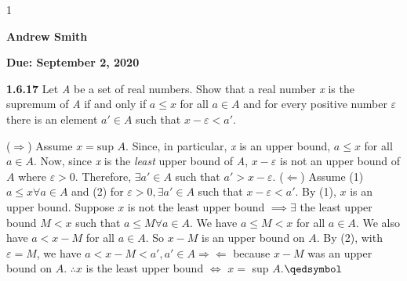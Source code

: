 \documentclass[12pt]{article}
\newcommand{\duedate}{September 2, 2020}
\newcommand{\yourname}{Andrew Smith}
\def\printsolutions{1}
\begin{document}
\if\printsolutions1
\begin{center}
\textbf{\Large \yourname}
\end{center}
\else
\begin{center}
\textbf{\Large Due: \duedate}
\end{center}
\fi


\begin{problem}\textbf{1.6.17}
Let \textit{A} be a set of real numbers. Show that a real number \textit{x} is the supremum of \textit{A} if and only if $a\leq x$ for all $a\in A$ and for every positive number $\varepsilon$ there is an element $a'\in A$ such that $x-\varepsilon<a'$.
\end{problem}
\begin{solution}\newline
($\Rightarrow$) Assume $x=\text{sup }A$.\newline
Since, in particular, \textit{x} is an upper bound, $a\leq x$ for all $a\in A$.\newline
Now, since \textit{x} is the \textit{least} upper bound of \textit{A}, $x-\varepsilon$ is not an upper bound of $A$ where $\varepsilon>0$.\newline
Therefore, $\exists a'\in A$ such that $a'>x-\varepsilon$.\newline
($\Leftarrow$) Assume (1) $a\leq x\forall a\in A$ and \newline
\indent\quad\quad\quad\quad\textit{ }(2) for $\varepsilon>0,\exists a'\in A$ such that $x-\varepsilon<a'$.\newline
By (1), $x$ is an upper bound.\newline
Suppose $x$ is not the least upper bound $\implies \exists$ the least upper bound $M<x$ such that $a\leq M\forall a\in A$.\newline
We have $a\leq M<x$ for all $a\in A$.\newline
We also have $a<x-M$ for all $a\in A$.\newline
So $x-M$ is an upper bound on $A$.
By (2), with $\varepsilon=M$, we have $a<x-M<a',a'\in A\Rightarrow\Leftarrow$ because $x-M$ was an upper bound on $A$.\newline
$\therefore x$ is the least upper bound $\iff$ $x=$ sup $A$.\flushright$\qedsymbol$
\end{solution}
\end{document}
